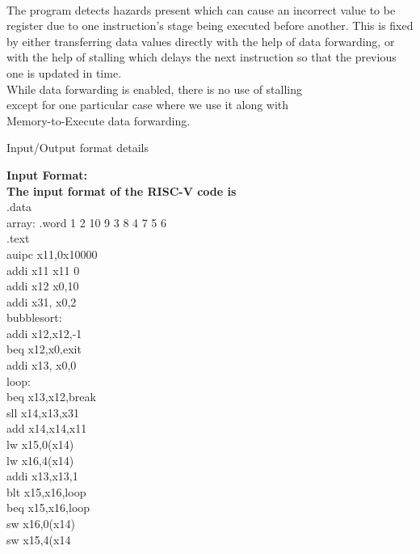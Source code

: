 \documentclass{article}
\begin{document}
\vspace{1cm}\\
The program detects hazards present which can cause an incorrect value to be register due to one instruction's stage being executed before another. This is fixed by either transferring data values directly with the help of data forwarding, or with the help of stalling which delays the next instruction so that the previous one is updated in time.\\

While data forwarding is enabled, there is no use of stalling\\ except for one particular case where we use it along with \\Memory-to-Execute data forwarding.\\


\newpage
\begin{centering}
\begin{Huge}
\textsf{Input/Output format details}\\
\end{Huge}
\vspace{0.6cm}
\end{centering}
\noindent
\LARGE
{\bf Input Format:}\\
{\bf The input format of the RISC-V code is}\\
.data\\
array: .word 1 2 10 9 3 8 4 7 5 6\\
.text\\
auipc x11,0x10000\\
addi x11 x11 0\\
addi x12 x0,10\\
addi x31,    x0,2\\
bubblesort: \\
addi x12,x12,-1 \\
beq x12,x0,exit \\
addi x13, x0,0 \\
loop:\\
beq x13,x12,break \\
sll x14,x13,x31 \\
add x14,x14,x11 \\
lw x15,0(x14) \\
lw x16,4(x14) \\
addi x13,x13,1 \\
blt x15,x16,loop\\
beq x15,x16,loop\\
sw x16,0(x14) \\
sw x15,4(x14\\
\end{document}
